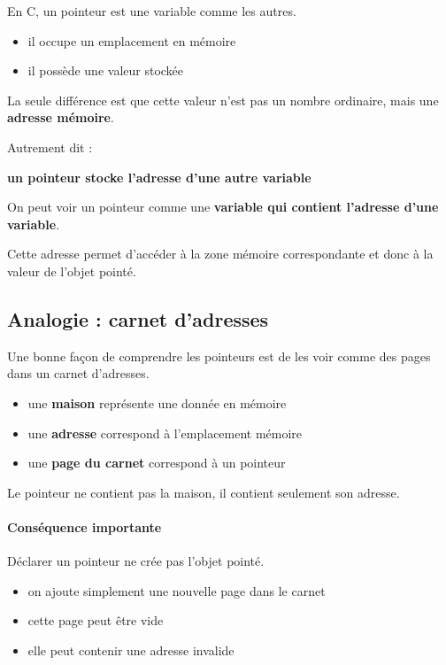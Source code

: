 En C, un pointeur est une variable comme les autres.

\begin{itemize}
    \item il occupe un emplacement en mémoire
    \item il possède une valeur stockée
\end{itemize}

La seule différence est que cette valeur n’est pas un nombre ordinaire,
mais une \textbf{adresse mémoire}.

Autrement dit :

\begin{center}
\textbf{un pointeur stocke l’adresse d’une autre variable}
\end{center}

On peut voir un pointeur comme une
\textbf{variable qui contient l’adresse d’une variable}.

Cette adresse permet d’accéder à la zone mémoire correspondante
et donc à la valeur de l’objet pointé.

\subsection{Analogie : carnet d’adresses}

Une bonne façon de comprendre les pointeurs
est de les voir comme des pages dans un carnet d’adresses.

\begin{itemize}
    \item une \textbf{maison} représente une donnée en mémoire
    \item une \textbf{adresse} correspond à l’emplacement mémoire
    \item une \textbf{page du carnet} correspond à un pointeur
\end{itemize}

Le pointeur ne contient pas la maison,
il contient seulement son adresse.

\paragraph{Conséquence importante}

Déclarer un pointeur ne crée pas l’objet pointé.

\begin{itemize}
    \item on ajoute simplement une nouvelle page dans le carnet
    \item cette page peut être vide
    \item elle peut contenir une adresse invalide
\end{itemize}

